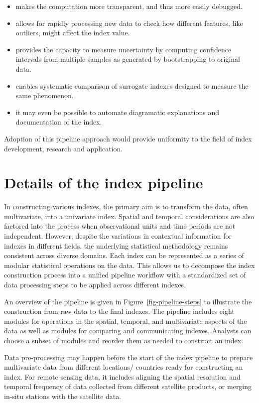 \documentclass[
]{interact}
\providecommand{\tightlist}{%
  \setlength{\itemsep}{0pt}\setlength{\parskip}{0pt}}\usepackage{longtable,booktabs,array}
\begin{document}
\begin{itemize}
\tightlist
\item
  makes the computation more transparent, and thus more easily debugged.
\item
  allows for rapidly processing new data to check how different
  features, like outliers, might affect the index value.
\item
  provides the capacity to measure uncertainty by computing confidence
  intervals from multiple samples as generated by bootstrapping to
  original data.
\item
  enables systematic comparison of surrogate indexes designed to measure
  the same phenomenon.
\item
  it may even be possible to automate diagramatic explanations and
  documentation of the index.
\end{itemize}

Adoption of this pipeline approach would provide uniformity to the field
of index development, research and application.

\hypertarget{sec-index-pipeline}{%
\section{Details of the index pipeline}\label{sec-index-pipeline}}

In constructing various indexes, the primary aim is to transform the
data, often multivariate, into a univariate index. Spatial and temporal
considerations are also factored into the process when observational
units and time periods are not independent. However, despite the
variations in contextual information for indexes in different fields,
the underlying statistical methodology remains consistent across diverse
domains. Each index can be represented as a series of modular
statistical operations on the data. This allows us to decompose the
index construction process into a unified pipeline workflow with a
standardized set of data processing steps to be applied across different
indexes.

An overview of the pipeline is given in Figure~\ref{fig-pipeline-steps}
to illustrate the construction from raw data to the final indexes. The
pipeline includes eight modules for operations in the spatial, temporal,
and multivariate aspects of the data as well as modules for comparing
and communicating indexes. Analysts can choose a subset of modules and
reorder them as needed to construct an index.

Data pre-processing may happen before the start of the index pipeline to
prepare multivariate data from different locations/ countries ready for
constructing an index. For remote sensing data, it includes aligning the
spatial resolution and temporal frequency of data collected from
different satellite products, or merging in-situ stations with the
satellite data.
\end{document}
